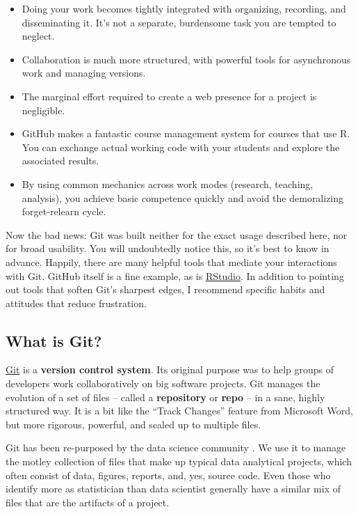 \documentclass[12pt]{article}
\providecommand{\tightlist}{%
  \setlength{\itemsep}{0pt}\setlength{\parskip}{0pt}}
\begin{document}
\begin{itemize}
\tightlist
\item
  Doing your work becomes tightly integrated with organizing, recording,
  and disseminating it. It's not a separate, burdensome task you are
  tempted to neglect.
\item
  Collaboration is much more structured, with powerful tools for
  asynchronous work and managing versions.
\item
  The marginal effort required to create a web presence for a project is
  negligible.
\item
  GitHub makes a fantastic course management system for courses that use
  R. You can exchange actual working code with your students and explore
  the associated results.
\item
  By using common mechanics across work modes (research, teaching,
  analysis), you achieve basic competence quickly and avoid the
  demoralizing forget-relearn cycle.
\end{itemize}

Now the bad news: Git was built neither for the exact usage described
here, nor for broad usability. You will undoubtedly notice this, so it's
best to know in advance. Happily, there are many helpful tools that
mediate your interactions with Git. GitHub itself is a fine example, as
is \href{https://www.rstudio.com/products/rstudio/}{RStudio}. In
addition to pointing out tools that soften Git's sharpest edges, I
recommend specific habits and attitudes that reduce frustration.

\subsection{What is Git?}\label{what-is-git}

\href{http://git-scm.com}{Git} is a \textbf{version control system}. Its
original purpose was to help groups of developers work collaboratively
on big software projects. Git manages the evolution of a set of files --
called a \textbf{repository} or \textbf{repo} -- in a sane, highly
structured way. It is a bit like the ``Track Changes'' feature from
Microsoft Word, but more rigorous, powerful, and scaled up to multiple
files.

Git has been re-purposed by the data science community
\citep{Ram2013, git-for-humans, ten-simple-rules-git}. We use it to
manage the motley collection of files that make up typical data
analytical projects, which often consist of data, figures, reports, and,
yes, source code. Even those who identify more as statistician than data
scientist generally have a similar mix of files that are the artifacts
of a project.
\end{document}
